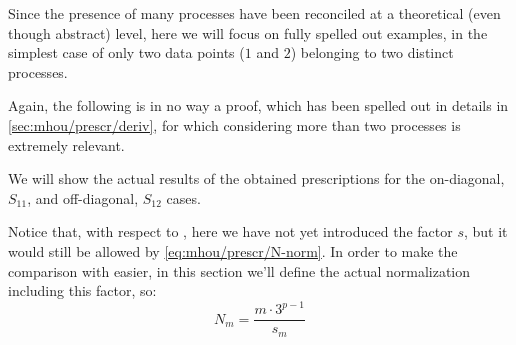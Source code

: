 Since the presence of many processes have been reconciled at a theoretical
(even though abstract) level, here we will focus on fully spelled out examples,
in the simplest case of only two data points ($1$ and $2$) belonging to two
distinct processes.

Again, the following is in no way a proof, which has been spelled out in
details in \cref{sec:mhou/prescr/deriv}, for which considering more than two processes is
extremely relevant.

We will show the actual results of the obtained prescriptions for the
on-diagonal, $S_{11}$, and off-diagonal, $S_{12}$ cases.

Notice that, with respect to \cite{NNPDF:2019ubu}, here we have not yet
introduced the factor $s$, but it would still be allowed by \cref{eq:mhou/prescr/N-norm}.
In order to make the comparison with \cite{NNPDF:2019ubu} easier, in this
section we'll define the actual normalization including this factor, so: 
\begin{equation}
    N_m = \frac{m \cdot 3^{p-1}}{s_m}
\end{equation}

